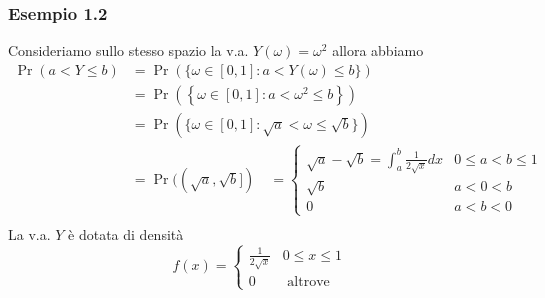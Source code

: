 \subsubsection*{Esempio 1.2}
Consideriamo sullo stesso spazio la v.a. $Y(\omega)=\omega^2$ allora abbiamo
\[
	\begin{aligned}
		\Pr(a<Y \leq b) & =\Pr(\{\omega \in[0,1]: a<Y(\omega) \leq b\})                                                                                         \\
		                & =\Pr\left(\left\{\omega \in[0,1]: a<\omega^2 \leq b\right\}\right)                                                                    \\
		                & =\Pr(\{\omega \in[0,1]: \sqrt{a}<\omega \leq \sqrt{b}\})                                                                              \\
		                & =\Pr((\sqrt{a}, \sqrt{b}]) \quad= \begin{cases}\sqrt{a}-\sqrt{b}=\int_a^b \frac{1}{2 \sqrt{x}} d x & 0 \leq a<b \leq 1 \\
             \sqrt{b}                                            & a<0<b             \\
             0                                                   & a<b<0\end{cases} \\
		                &
	\end{aligned}
\]
La v.a. $Y$ è dotata di densità
\[
	f(x)= \begin{cases}\frac{1}{2 \sqrt{x}} & 0 \leq x \leq 1 \\ 0 & \text { altrove }\end{cases}
\]
\vskip3mm
%
